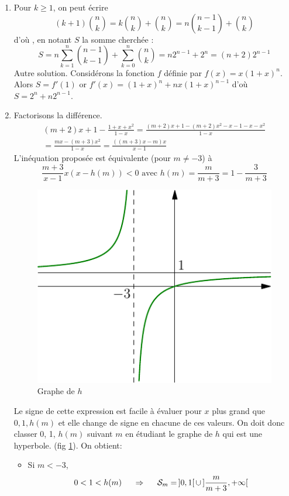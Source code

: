 \begin{enumerate}
  \item Pour $k\geq 1$, on peut {\'e}crire
\begin{displaymath}
 (k+1)\binom{n}{k} = k \binom{n}{k} + \binom{n}{k} = n \binom{n-1}{k-1} + \binom{n}{k} 
\end{displaymath}
d'o{\`u} , en notant $S$ la somme cherch{\'e}e :
\begin{displaymath}
 S=n\sum_{k=1}^n\binom{n-1}{k-1}+\sum_{k=0}^n\binom{n}{k}= n2^{n-1}+2^n = (n+2)2^{n-1}
\end{displaymath}
Autre solution. Consid{\'e}rons la fonction $f$ définie par $f(x)=x(1+x)^n$. Alors $S=f'(1)$ or $f'(x)=(1+x)^n+nx(1+x)^{n-1}$ d'où $S=2^n+n2^{n-1}$.

\item Factorisons la différence. 
\begin{multline*}
  (m+2)x+1 - \frac{1+x+x^2}{1-x} = \frac{(m+2)x+1-(m+2)x^2 -x-1-x-x^2}{1-x}\\
  = \frac{mx-(m+3)x^2}{1-x} = \frac{\left((m+3)x-m \right)x }{x-1}
\end{multline*}
L'in{\'e}quation propos{\'e}e est {\'e}quivalente (pour $m\neq -3$) {\`a}
\begin{displaymath}
 \frac{m+3}{x-1}x(x-h(m))<0 \text{ avec } h(m)=\frac{m}{m+3}= 1-\frac{3}{m+3}
\end{displaymath}
\begin{figure}[h!t]
 \centering
 \includegraphics{./Celem5_1.pdf}
 \caption{Graphe de $h$}
 \label{fig:Celem5_1}
\end{figure}
Le signe de cette expression est facile à évaluer pour $x$ plus grand que $0, 1, h(m)$ et elle change de signe en chacune de ces valeurs. On doit donc classer 0, 1, $h(m)$ suivant $m$ en étudiant le graphe de $h$ qui est une hyperbole. (fig \ref{fig:Celem5_1}). On obtient:
\begin{itemize}
  \item Si $m < -3$,
\begin{displaymath}
0 < 1 < h(m)\hspace{0.5cm}\Rightarrow \hspace{0.5cm} \mathcal{S}_m = \,]0,1[\, \cup \, ]\frac{m}{m+3},+\infty[  
\end{displaymath}


\end{itemize}
\end{enumerate}
